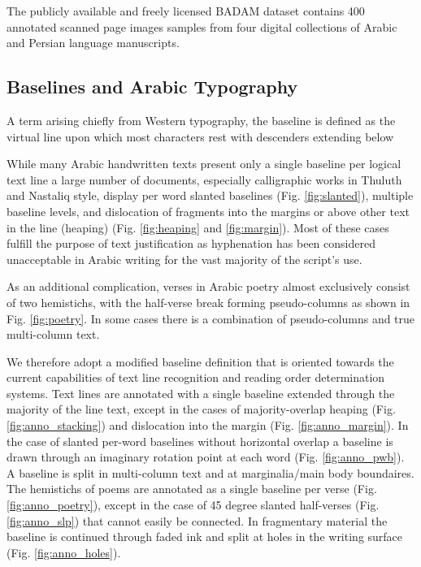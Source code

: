 The publicly available and freely licensed BADAM dataset contains 400 annotated
scanned page images samples from four digital collections of Arabic and Persian
language manuscripts.

\subsection{Baselines and Arabic Typography}

A term arising chiefly from Western typography, the baseline is defined as the
virtual line upon which most characters rest with descenders extending below 

While many Arabic handwritten texts present only a single baseline per logical
text line a large number of documents, especially calligraphic works in Thuluth
and Nastaliq style, display per word slanted baselines (Fig.
\ref{fig:slanted}), multiple baseline levels, and dislocation of fragments into
the margins or above other text in the line (heaping) (Fig. \ref{fig:heaping}
and \ref{fig:margin}). Most of these cases fulfill the purpose of text
justification as hyphenation has been considered unacceptable in Arabic writing
for the vast majority of the script's use.

As an additional complication, verses in Arabic poetry almost exclusively
consist of two hemistichs, with the half-verse break forming pseudo-columns as
shown in Fig. \ref{fig:poetry}. In some cases there is a combination of
pseudo-columns and true multi-column text.

We therefore adopt a modified baseline definition that is oriented towards the
current capabilities of text line recognition and reading order determination
systems. Text lines are annotated with a single baseline extended through the
majority of the line text, except in the cases of majority-overlap heaping
(Fig. \ref{fig:anno_stacking}) and dislocation into the margin (Fig. \ref{fig:anno_margin}).
In the case of slanted per-word baselines without horizontal overlap a baseline
is drawn through an imaginary rotation point at each word (Fig. \ref{fig:anno_pwb}). A
baseline is split in multi-column text and at marginalia/main body boundaires.
The hemistichs of poems are annotated as a single baseline per verse
(Fig. \ref{fig:anno_poetry}), except in the case of 45 degree slanted half-verses
(Fig. \ref{fig:anno_slp}) that cannot easily be connected. In fragmentary material the
baseline is continued through faded ink and split at holes in the writing
surface (Fig. \ref{fig:anno_holes}).


